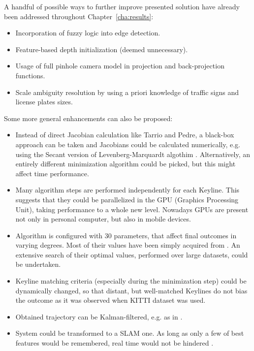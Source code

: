 
A handful of possible ways to further improve presented solution have already been addressed throughout Chapter~\ref{cha:results}:
\begin{itemize}
	\item Incorporation of fuzzy logic into edge detection.
	\item Feature-based depth initialization (deemed unnecessary).
	\item Usage of full pinhole camera model in projection and back-projection functions.
	\item Scale ambiguity resolution by using a priori knowledge of traffic signs and license plates sizes.
\end{itemize}

Some more general enhancements can also be proposed:
\begin{itemize}
	\item Instead of direct Jacobian calculation like Tarrio and Pedre, a black-box approach can be taken and Jacobians could be calculated numerically, e.g. using the Secant version of Levenberg-Marquardt algothim \cite{madsen2004methods}. Alternatively, an entirely different minimization algorithm could be picked, but this might affect time performance.
	\item Many algorithm steps are performed independently for each Keyline. This suggests that they could be parallelized in the GPU (Graphics Processing Unit), taking performance to a whole new level. Nowadays GPUs are present not only in personal computer, but also in mobile devices.
	\item Algorithm is configured with 30 parameters, that affect final outcomes in varying degrees. Most of their values have been simply acquired from \cite{jose2015realtime}. An extensive search of their optimal values, performed over large datasets, could be undertaken.
	\item Keyline matching criteria (especially during the minimization step) could be dynamically changed, so that distant, but well-matched Keylines do not bias the outcome as it was observed when KITTI \cite{kitti} dataset was used.
	\item Obtained trajectory can be Kalman-filtered, e.g. as in \cite{min2015visual}.
	\item System could be transformed to a SLAM one. As long as only a few of best features would be remembered, real time would not be hindered \cite{monoslam}.
\end{itemize}


